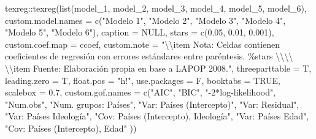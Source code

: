 \documentclass[
  12pt,
  a4paper,
]{article}
\newenvironment{Shaded}{\begin{snugshade}}{\end{snugshade}}
\newcommand{\AttributeTok}[1]{\textcolor[rgb]{0.77,0.63,0.00}{#1}}
\newcommand{\ConstantTok}[1]{\textcolor[rgb]{0.00,0.00,0.00}{#1}}
\newcommand{\FloatTok}[1]{\textcolor[rgb]{0.00,0.00,0.81}{#1}}
\newcommand{\FunctionTok}[1]{\textcolor[rgb]{0.00,0.00,0.00}{#1}}
\newcommand{\NormalTok}[1]{#1}
\newcommand{\SpecialCharTok}[1]{\textcolor[rgb]{0.00,0.00,0.00}{#1}}
\newcommand{\StringTok}[1]{\textcolor[rgb]{0.31,0.60,0.02}{#1}}
\begin{document}
\begin{Shaded}
\begin{Highlighting}[]
\NormalTok{texreg}\SpecialCharTok{::}\FunctionTok{texreg}\NormalTok{(}\FunctionTok{list}\NormalTok{(model\_1, model\_2, model\_3, model\_4, model\_5, model\_6),}
               \AttributeTok{custom.model.names =} \FunctionTok{c}\NormalTok{(}\StringTok{"Modelo 1"}\NormalTok{,}
                                      \StringTok{"Modelo 2"}\NormalTok{,}
                                      \StringTok{"Modelo 3"}\NormalTok{,}
                                      \StringTok{"Modelo 4"}\NormalTok{,}
                                      \StringTok{"Modelo 5"}\NormalTok{,}
                                      \StringTok{"Modelo 6"}\NormalTok{),}
               \AttributeTok{caption =} \ConstantTok{NULL}\NormalTok{,}
               \AttributeTok{stars =} \FunctionTok{c}\NormalTok{(}\FloatTok{0.05}\NormalTok{, }\FloatTok{0.01}\NormalTok{, }\FloatTok{0.001}\NormalTok{),}
               \AttributeTok{custom.coef.map =}\NormalTok{ ccoef,}
               \AttributeTok{custom.note =} \StringTok{"}\SpecialCharTok{\textbackslash{}\textbackslash{}}\StringTok{item Nota: Celdas contienen coeficientes de regresión con errores estándares entre paréntesis. \%stars }\SpecialCharTok{\textbackslash{}\textbackslash{}\textbackslash{}\textbackslash{}}\StringTok{ }\SpecialCharTok{\textbackslash{}\textbackslash{}}\StringTok{item Fuente: Elaboración propia en base a LAPOP 2008."}\NormalTok{,}
               \AttributeTok{threeparttable =}\NormalTok{ T,}
               \AttributeTok{leading.zero =}\NormalTok{ T,}
               \AttributeTok{float.pos =} \StringTok{"h!"}\NormalTok{,}
               \AttributeTok{use.packages =}\NormalTok{ F,}
               \AttributeTok{booktabs =} \ConstantTok{TRUE}\NormalTok{,}
               \AttributeTok{scalebox =} \FloatTok{0.7}\NormalTok{,}
               \AttributeTok{custom.gof.names =} \FunctionTok{c}\NormalTok{(}\StringTok{"AIC"}\NormalTok{, }
                                    \StringTok{"BIC"}\NormalTok{, }
                                    \StringTok{"{-}2*log{-}likelihood"}\NormalTok{, }
                                    \StringTok{"Num.obs"}\NormalTok{, }
                                    \StringTok{"Num. grupos: Países"}\NormalTok{,}
                                    \StringTok{"Var: Países (Intercepto)"}\NormalTok{,}
                                    \StringTok{"Var: Residual"}\NormalTok{,}
                                    \StringTok{"Var: Países Ideología"}\NormalTok{,}
                                    \StringTok{"Cov: Países (Intercepto), Ideología"}\NormalTok{,}
                                     \StringTok{"Var: Países Edad"}\NormalTok{,}
                                    \StringTok{"Cov: Países (Intercepto), Edad"}
\NormalTok{                                    ))}
\end{Highlighting}
\end{Shaded}
\end{document}
